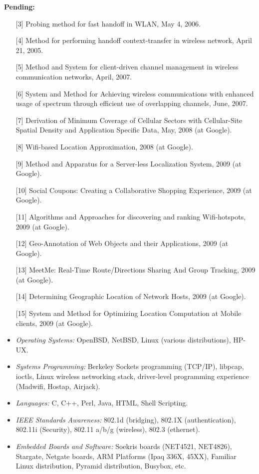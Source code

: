 \begin{resume}
{\bf Pending:}
    \begin{itemize}
       \item [] [3] Probing method for fast handoff in WLAN, May 4,
       2006.
       \item [] [4] Method for performing handoff context-transfer in wireless
       network, April 21, 2005.
       \item [] [5] Method and System for client-driven channel management in
       wireless communication networks, April, 2007.
       \item [] [6] System and Method for Achieving wireless communications
       with enhanced usage of spectrum through efficient use of overlapping
       channels, June, 2007.
       \item [] [7] Derivation of Minimum Coverage of Cellular Sectors with Cellular-Site Spatial Density and Application Specific Data, 
       May, 2008 (at Google).
       \item [] [8] Wifi-based Location Approximation, 2008 (at Google).
       \item [] [9] Method and Apparatus for a Server-less Localization System, 2009 (at Google).
       \item [] [10] Social Coupons: Creating a Collaborative Shopping Experience, 2009 (at Google).
       \item [] [11] Algorithms and Approaches for discovering and ranking Wifi-hotspots, 2009 (at Google).
       \item [] [12] Geo-Annotation of Web Objects and their Applications, 2009 (at Google). 
       \item [] [13] MeetMe: Real-Time Route/Directions Sharing And Group Tracking, 2009 (at Google).
       \item [] [14] Determining Geographic Location of Network Hosts, 2009 (at Google).
       \item [] [15] System and Method for Optimizing Location Computation at Mobile clients, 2009 (at Google).
    \end{itemize}

\begin{itemize}

\item {\it Operating Systems:} OpenBSD, NetBSD, Linux (various distributions), HP-UX.
\item {\it Systems Programming:} Berkeley Sockets programming (TCP/IP), libpcap, ioctls, Linux wireless networking stack, driver-level programming experience (Madwifi,
Hostap, Airjack). 
\item {\it Languages:} C, C++, Perl, Java, HTML, Shell Scripting.
\item {\it IEEE Standards Awareness:} 802.1d (bridging), 802.1X (authentication), 802.11i (Security), 802.11 a/b/g
(wireless), 802.3 (ethernet).
\item {\it Embedded Boards and Software:} Soekris boards (NET4521, NET4826), Stargate, Netgate boards, ARM Platforms (Ipaq 336X,
45XX), Familiar Linux distribution, Pyramid distribution, Busybox, etc. 
\end{itemize}


\end{resume}
